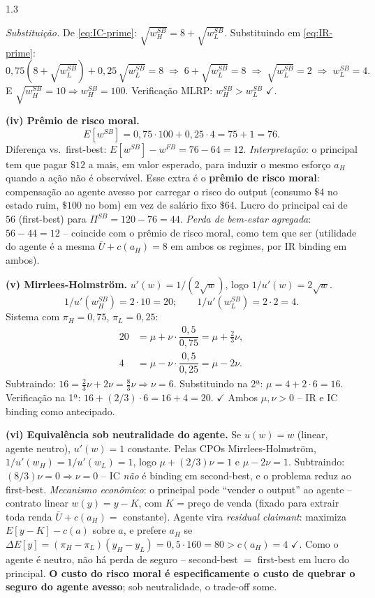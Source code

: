 \documentclass[11pt,addpoints]{exam}
\begin{document}
\begin{spacing}{1.3}
\begin{questions}
\begin{parts}
\begin{solution}
\emph{Substituição.} De \eqref{eq:IC-prime}: $\sqrt{w^{SB}_H} = 8 + \sqrt{w^{SB}_L}$. Substituindo em \eqref{eq:IR-prime}:
\[
    0{,}75(8 + \sqrt{w^{SB}_L}) + 0{,}25\, \sqrt{w^{SB}_L} = 8 \;\Longrightarrow\; 6 + \sqrt{w^{SB}_L} = 8 \;\Longrightarrow\; \sqrt{w^{SB}_L} = 2 \;\Longrightarrow\; \boxed{w^{SB}_L = 4.}
\]
E $\sqrt{w^{SB}_H} = 10 \Rightarrow \boxed{w^{SB}_H = 100.}$ Verificação MLRP: $w^{SB}_H > w^{SB}_L$ $\checkmark$.

\textbf{(iv) Prêmio de risco moral.}
\[
    E[w^{SB}] = 0{,}75 \cdot 100 + 0{,}25 \cdot 4 = 75 + 1 = 76.
\]
Diferença vs.\ first-best: $E[w^{SB}] - w^{FB} = 76 - 64 = \boxed{12}$. \emph{Interpretação}: o principal tem que pagar $\$ 12$ a mais, em valor esperado, para induzir o mesmo esforço $a_H$ quando a ação não é observável. Esse extra é o \textbf{prêmio de risco moral}: compensação ao agente avesso por carregar o risco do output (consumo $\$ 4$ no estado ruim, $\$ 100$ no bom) em vez de salário fixo $\$ 64$. Lucro do principal cai de $56$ (first-best) para $\Pi^{SB} = 120 - 76 = 44$. \emph{Perda de bem-estar agregada}: $56 - 44 = 12$ -- coincide com o prêmio de risco moral, como tem que ser (utilidade do agente é a mesma $\bar U + c(a_H) = 8$ em ambos os regimes, por IR binding em ambos).

\textbf{(v) Mirrlees-Holmström.} $u'(w) = 1/(2\sqrt{w})$, logo $1/u'(w) = 2\sqrt{w}$.
\[
    1/u'(w^{SB}_H) = 2 \cdot 10 = 20;\qquad 1/u'(w^{SB}_L) = 2 \cdot 2 = 4.
\]
Sistema com $\pi_H = 0{,}75$, $\pi_L = 0{,}25$:
\begin{align*}
    20 &= \mu + \nu \cdot \dfrac{0{,}5}{0{,}75} = \mu + \tfrac{2}{3}\nu, \\
    4 &= \mu - \nu \cdot \dfrac{0{,}5}{0{,}25} = \mu - 2\nu.
\end{align*}
Subtraindo: $16 = \tfrac{2}{3}\nu + 2\nu = \tfrac{8}{3}\nu \Rightarrow \boxed{\nu = 6.}$ Substituindo na 2ª: $\mu = 4 + 2\cdot 6 = \boxed{16.}$ Verificação na 1ª: $16 + (2/3)\cdot 6 = 16 + 4 = 20$. $\checkmark$ Ambos $\mu, \nu > 0$ -- IR e IC binding como antecipado.

\textbf{(vi) Equivalência sob neutralidade do agente.} Se $u(w) = w$ (linear, agente neutro), $u'(w) = 1$ constante. Pelas CPOs Mirrlees-Holmström, $1/u'(w_H) = 1/u'(w_L) = 1$, logo $\mu + (2/3)\nu = 1$ e $\mu - 2\nu = 1$. Subtraindo: $(8/3)\nu = 0 \Rightarrow \nu = 0$ -- IC \emph{não} é binding em second-best, e o problema reduz ao first-best. \emph{Mecanismo econômico}: o principal pode ``vender o output'' ao agente -- contrato linear $w(y) = y - K$, com $K$ = preço de venda (fixado para extrair toda renda $\bar U + c(a_H) = $ constante). Agente vira \emph{residual claimant}: maximiza $E[y - K] - c(a)$ sobre $a$, e prefere $a_H$ se $\Delta E[y] = (\pi_H - \pi_L)(y_H - y_L) = 0{,}5\cdot 160 = 80 > c(a_H) = 4$ $\checkmark$. Como o agente é neutro, não há perda de seguro -- second-best $=$ first-best em lucro do principal. \textbf{O custo do risco moral é especificamente o custo de quebrar o seguro do agente avesso}; sob neutralidade, o trade-off some.
\end{solution}


\end{parts}
\end{questions}
\end{spacing}
\end{document}
